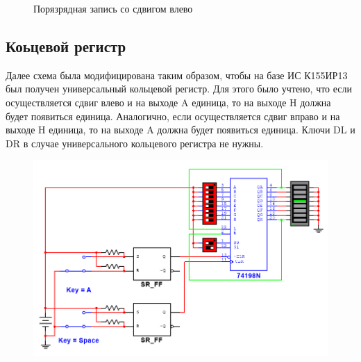 \begin{figure}[H]
    \hspace{20mm}
    \caption{Порязрядная запись со сдвигом влево}
\end{figure}

\newpage

\subsection*{Коьцевой регистр}

Далее схема была модифицирована таким образом, чтобы на базе ИС К155ИР13 был
получен универсальный кольцевой регистр. Для этого было учтено, что если
осуществляется сдвиг влево и на выходе A единица, то на выходе H должна будет появиться
единица. Аналогично, если осуществляется сдвиг вправо и на выходе H единица, то на
выходе A должна будет появиться единица. Ключи DL и DR в случае универсального
кольцевого регистра не нужны.

\begin{figure}[h!]
    \centering
    \includegraphics[scale=0.7]{images/image-3.png}
\end{figure}

